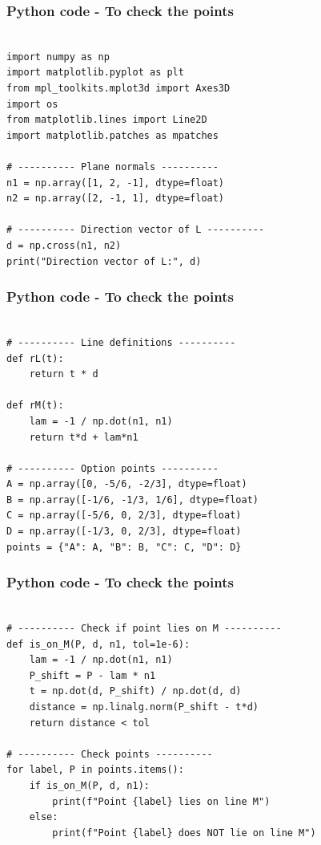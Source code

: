 \documentclass{beamer}
\begin{document}
\begin{frame}[fragile]                            
\frametitle{Python code - To check the points }                
\begin{lstlisting}

import numpy as np
import matplotlib.pyplot as plt
from mpl_toolkits.mplot3d import Axes3D
import os
from matplotlib.lines import Line2D
import matplotlib.patches as mpatches

# ---------- Plane normals ----------
n1 = np.array([1, 2, -1], dtype=float)
n2 = np.array([2, -1, 1], dtype=float)

# ---------- Direction vector of L ----------
d = np.cross(n1, n2)
print("Direction vector of L:", d)
\end{lstlisting}
\end{frame}
\begin{frame}[fragile]                            
\frametitle{Python code - To check the points }                
\begin{lstlisting}

# ---------- Line definitions ----------
def rL(t):
    return t * d

def rM(t):
    lam = -1 / np.dot(n1, n1)
    return t*d + lam*n1

# ---------- Option points ----------
A = np.array([0, -5/6, -2/3], dtype=float)
B = np.array([-1/6, -1/3, 1/6], dtype=float)
C = np.array([-5/6, 0, 2/3], dtype=float)
D = np.array([-1/3, 0, 2/3], dtype=float)
points = {"A": A, "B": B, "C": C, "D": D}
\end{lstlisting}
\end{frame}
\begin{frame}[fragile]                            
\frametitle{Python code - To check the points }                
\begin{lstlisting}

# ---------- Check if point lies on M ----------
def is_on_M(P, d, n1, tol=1e-6):
    lam = -1 / np.dot(n1, n1)
    P_shift = P - lam * n1
    t = np.dot(d, P_shift) / np.dot(d, d)
    distance = np.linalg.norm(P_shift - t*d)
    return distance < tol

# ---------- Check points ----------
for label, P in points.items():
    if is_on_M(P, d, n1):
        print(f"Point {label} lies on line M")
    else:
        print(f"Point {label} does NOT lie on line M")



\end{lstlisting}
\end{frame}
\end{document}

